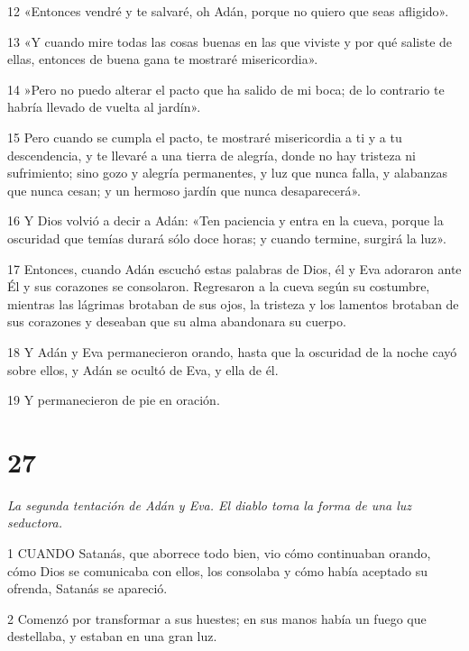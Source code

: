 \par 12 «Entonces vendré y te salvaré, oh Adán, porque no quiero que seas afligido».

\par 13 «Y cuando mire todas las cosas buenas en las que viviste y por qué saliste de ellas, entonces de buena gana te mostraré misericordia».

\par 14 »Pero no puedo alterar el pacto que ha salido de mi boca; de lo contrario te habría llevado de vuelta al jardín».

\par 15 Pero cuando se cumpla el pacto, te mostraré misericordia a ti y a tu descendencia, y te llevaré a una tierra de alegría, donde no hay tristeza ni sufrimiento; sino gozo y alegría permanentes, y luz que nunca falla, y alabanzas que nunca cesan; y un hermoso jardín que nunca desaparecerá».

\par 16 Y Dios volvió a decir a Adán: «Ten paciencia y entra en la cueva, porque la oscuridad que temías durará sólo doce horas; y cuando termine, surgirá la luz».

\par 17 Entonces, cuando Adán escuchó estas palabras de Dios, él y Eva adoraron ante Él y sus corazones se consolaron. Regresaron a la cueva según su costumbre, mientras las lágrimas brotaban de sus ojos, la tristeza y los lamentos brotaban de sus corazones y deseaban que su alma abandonara su cuerpo.

\par 18 Y Adán y Eva permanecieron orando, hasta que la oscuridad de la noche cayó sobre ellos, y Adán se ocultó de Eva, y ella de él.

\par 19 Y permanecieron de pie en oración.

\chapter{27}

\par \textit{La segunda tentación de Adán y Eva. El diablo toma la forma de una luz seductora.}

\par 1 CUANDO Satanás, que aborrece todo bien, vio cómo continuaban orando, cómo Dios se comunicaba con ellos, los consolaba y cómo había aceptado su ofrenda, Satanás se apareció.

\par 2 Comenzó por transformar a sus huestes; en sus manos había un fuego que destellaba, y estaban en una gran luz.

